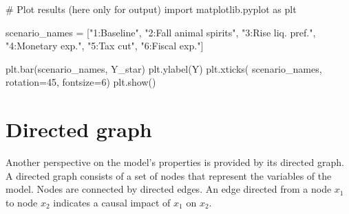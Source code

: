 \documentclass[
  letterpaper,
  DIV=11,
  numbers=noendperiod]{scrreprt}
\newenvironment{Shaded}{\begin{snugshade}}{\end{snugshade}}
\newcommand{\CommentTok}[1]{\textcolor[rgb]{0.37,0.37,0.37}{#1}}
\newcommand{\DecValTok}[1]{\textcolor[rgb]{0.68,0.00,0.00}{#1}}
\newcommand{\ImportTok}[1]{\textcolor[rgb]{0.00,0.46,0.62}{#1}}
\newcommand{\NormalTok}[1]{\textcolor[rgb]{0.00,0.23,0.31}{#1}}
\newcommand{\OperatorTok}[1]{\textcolor[rgb]{0.37,0.37,0.37}{#1}}
\newcommand{\StringTok}[1]{\textcolor[rgb]{0.13,0.47,0.30}{#1}}
\begin{document}
\begin{tcolorbox}[enhanced jigsaw, titlerule=0mm, breakable, bottomrule=.15mm, toprule=.15mm, colbacktitle=quarto-callout-note-color!10!white, rightrule=.15mm, toptitle=1mm, opacityback=0, left=2mm, coltitle=black, title=\textcolor{quarto-callout-note-color}{\faInfo}\hspace{0.5em}{Python code}, colframe=quarto-callout-note-color-frame, opacitybacktitle=0.6, leftrule=.75mm, bottomtitle=1mm, arc=.35mm, colback=white]

\begin{Shaded}
\begin{Highlighting}[]
\CommentTok{\# Plot results (here only for output)    }
\ImportTok{import}\NormalTok{ matplotlib.pyplot }\ImportTok{as}\NormalTok{ plt}

\NormalTok{scenario\_names }\OperatorTok{=}\NormalTok{ [}\StringTok{"1:Baseline"}\NormalTok{, }\StringTok{"2:Fall animal spirits"}\NormalTok{, }\StringTok{"3:Rise liq. pref."}\NormalTok{,}
                  \StringTok{"4:Monetary exp."}\NormalTok{, }\StringTok{"5:Tax cut"}\NormalTok{, }\StringTok{"6:Fiscal exp."}\NormalTok{]}

\NormalTok{plt.bar(scenario\_names, Y\_star)}
\NormalTok{plt.ylabel(}\StringTok{\textquotesingle{}Y\textquotesingle{}}\NormalTok{)}
\NormalTok{plt.xticks( scenario\_names, rotation}\OperatorTok{=}\DecValTok{45}\NormalTok{, fontsize}\OperatorTok{=}\DecValTok{6}\NormalTok{)}
\NormalTok{plt.show()}
\end{Highlighting}
\end{Shaded}

\end{tcolorbox}

\section{Directed graph}\label{directed-graph-1}

Another perspective on the model's properties is provided by its
directed graph. A directed graph consists of a set of nodes that
represent the variables of the model. Nodes are connected by directed
edges. An edge directed from a node \(x_{1}\) to node \(x_{2}\)
indicates a causal impact of \(x_{1}\) on \(x_{2}\).
\end{document}
